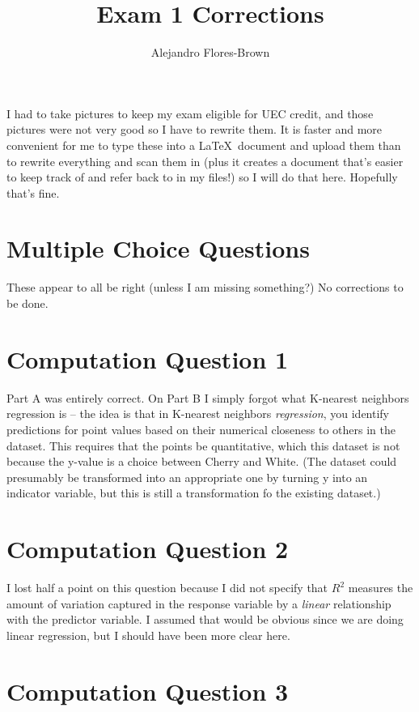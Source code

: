 \documentclass[12pt, letterpaper, parskip = full]{article}
\title{Exam 1 Corrections}
\author{Alejandro Flores-Brown}
\begin{document}
	\maketitle

    I had to take pictures to keep my exam eligible for UEC credit, and those pictures were not very good so I have to rewrite them. It is faster and more convenient for me to type these into a \LaTeX\ document and upload them than to rewrite everything and scan them in (plus it creates a document that's easier to keep track of and refer back to in my files!) so I will do that here. Hopefully that's fine.

    \section{Multiple Choice Questions}

    These appear to all be right (unless I am missing something?) No corrections to be done.

    \section{Computation Question 1}

    Part A was entirely correct. On Part B I simply forgot what K-nearest neighbors regression is -- the idea is that in K-nearest neighbors \emph{regression}, you identify predictions for point values based on their numerical closeness to others in the dataset. This requires that the points be quantitative, which this dataset is not because the y-value is a choice between Cherry and White. (The dataset could presumably be transformed into an appropriate one by turning y into an indicator variable, but this is still a transformation fo the existing dataset.)

    \section{Computation Question 2}

    I lost half a point on this question because I did not specify that \(R^2\) measures the amount of variation captured in the response variable by a \emph{linear} relationship with the predictor variable. I assumed that would be obvious since we are doing linear regression, but I should have been more clear here.

    \section{Computation Question 3}
\end{document}
